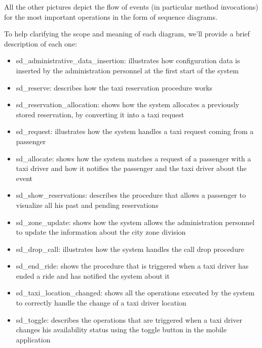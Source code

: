 \begin{landscape}

\end{landscape}


All the other pictures depict the flow of events (in particular method invocations) for the most important operations in the form of sequence diagrams. 

To help clarifying the scope and meaning of each diagram, we'll provide a brief description of each one: 
\begin{itemize}
	\item sd\_administrative\_data\_insertion: illustrates how configuration data is inserted by the administration personnel at the first start of the system
	\item sd\_reserve: describes how the taxi reservation procedure works
	\item sd\_reservation\_allocation: shows how the system allocates a previously stored reservation, by converting it into a taxi request
	\item sd\_request: illustrates how the system handles a taxi request coming from a passenger
	\item sd\_allocate: shows how the system matches a request of a passenger with a taxi driver and how it notifies the passenger and the taxi driver about the event
	\item sd\_show\_reservations: describes the procedure that allows a passenger to visualize all his past and pending reservations
	\item sd\_zone\_update: shows how the system allows the administration personnel to update the information about the city zone division
	\item sd\_drop\_call: illustrates how the system handles the call drop procedure
	\item sd\_end\_ride: shows the procedure that is triggered when a taxi driver has ended a ride and has notified the system about it
	\item sd\_taxi\_location\_changed: shows all the operations executed by the system to correctly handle the change of a taxi driver location
	\item sd\_toggle: describes the operations that are triggered when a taxi driver changes his availability status using the toggle button in the mobile application
\end{itemize}

\begin{landscape}

\end{landscape}

